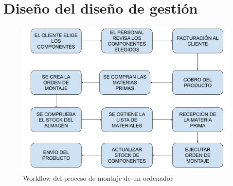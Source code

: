 \documentclass[12pt, letterpaper]{article}
\begin{document}
\section{\textsf{Diseño del diseño de gestión}}
\begin{figure}[ht]
    \includegraphics[width=\textwidth]{workflow.png}
    \caption{\textsf{Workflow del proceso de montaje de un ordenador}}
    \label{workflow}
\end{figure}

\end{document}
